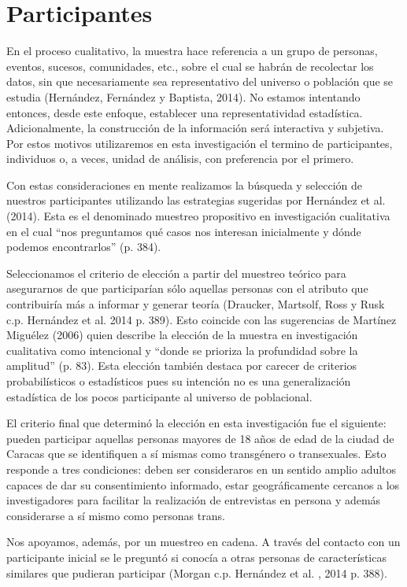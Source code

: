 \section{Participantes}
En el proceso cualitativo, la muestra hace referencia a un grupo de personas,
eventos, sucesos, comunidades, etc., sobre el cual se habrán de recolectar los
datos, sin que necesariamente sea representativo del universo o población que se
estudia (Hernández, Fernández y Baptista, 2014).
No estamos intentando entonces, desde este enfoque, establecer una
representatividad estadística.
Adicionalmente, la construcción de la información será interactiva y subjetiva.
Por estos motivos utilizaremos en esta investigación el termino de
participantes, individuos o, a veces, unidad de análisis, con preferencia por el
primero.

Con estas consideraciones en mente realizamos la búsqueda y selección de
nuestros participantes utilizando las estrategias sugeridas por Hernández et al.
(2014).
Esta es el denominado muestreo propositivo en investigación cualitativa en el
cual “nos preguntamos qué casos nos interesan inicialmente y dónde podemos
encontrarlos” (p. 384).

Seleccionamos el criterio de elección a partir del muestreo teórico para
asegurarnos de que participarían sólo aquellas personas con el atributo que
contribuiría más a informar y generar teoría (Draucker, Martsolf, Ross y Rusk
c.p. Hernández et al. 2014 p. 389).
Esto coincide con las sugerencias de Martínez Miguélez (2006) quien describe la
elección de la muestra en investigación cualitativa como intencional y “donde se
prioriza la profundidad sobre la amplitud” (p. 83).
Esta elección también destaca por carecer de criterios probabilísticos o
estadísticos pues su intención no es una generalización estadística de los pocos
participante al universo de poblacional.

El criterio final que determinó la elección en esta investigación fue el
siguiente: pueden participar aquellas personas mayores de 18 años de edad de la
ciudad de Caracas que se identifiquen a sí mismas como transgénero o
transexuales.
Esto responde a tres condiciones: deben ser consideraros en un sentido amplio
adultos capaces de dar su consentimiento informado, estar geográficamente
cercanos a los investigadores para facilitar la realización de entrevistas en
persona y además considerarse a sí mismo como personas trans.

Nos apoyamos, además, por un muestreo en cadena.
A través del contacto con un participante inicial se le preguntó si conocía a
otras personas de características similares que pudieran participar (Morgan c.p.
Hernández et  al. , 2014 p. 388).

